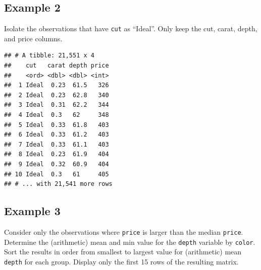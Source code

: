 \documentclass[
]{book}
\newenvironment{Shaded}{\begin{snugshade}}{\end{snugshade}}
\newcommand{\DataTypeTok}[1]{\textcolor[rgb]{0.13,0.29,0.53}{#1}}
\newcommand{\DecValTok}[1]{\textcolor[rgb]{0.00,0.00,0.81}{#1}}
\newcommand{\KeywordTok}[1]{\textcolor[rgb]{0.13,0.29,0.53}{\textbf{#1}}}
\newcommand{\NormalTok}[1]{#1}
\newcommand{\OperatorTok}[1]{\textcolor[rgb]{0.81,0.36,0.00}{\textbf{#1}}}
\newcommand{\StringTok}[1]{\textcolor[rgb]{0.31,0.60,0.02}{#1}}
\begin{document}
\hypertarget{example-2-1}{%
\subsection{Example 2}\label{example-2-1}}

Isolate the observations that have \texttt{cut} as ``Ideal''. Only keep the cut, carat, depth, and price columns.

\begin{Shaded}
\end{Shaded}

\begin{verbatim}
## # A tibble: 21,551 x 4
##    cut   carat depth price
##    <ord> <dbl> <dbl> <int>
##  1 Ideal  0.23  61.5   326
##  2 Ideal  0.23  62.8   340
##  3 Ideal  0.31  62.2   344
##  4 Ideal  0.3   62     348
##  5 Ideal  0.33  61.8   403
##  6 Ideal  0.33  61.2   403
##  7 Ideal  0.33  61.1   403
##  8 Ideal  0.23  61.9   404
##  9 Ideal  0.32  60.9   404
## 10 Ideal  0.3   61     405
## # ... with 21,541 more rows
\end{verbatim}

\hypertarget{example-3}{%
\subsection{Example 3}\label{example-3}}

Consider only the observations where \texttt{price} is larger than the median \texttt{price}. Determine the (arithmetic) mean and min value for the \texttt{depth} variable by \texttt{color}. Sort the results in order from smallest to largest value for (arithmetic) mean \texttt{depth} for each group. Display only the first 15 rows of the resulting matrix.

\begin{Shaded}
\end{Shaded}
\end{document}
